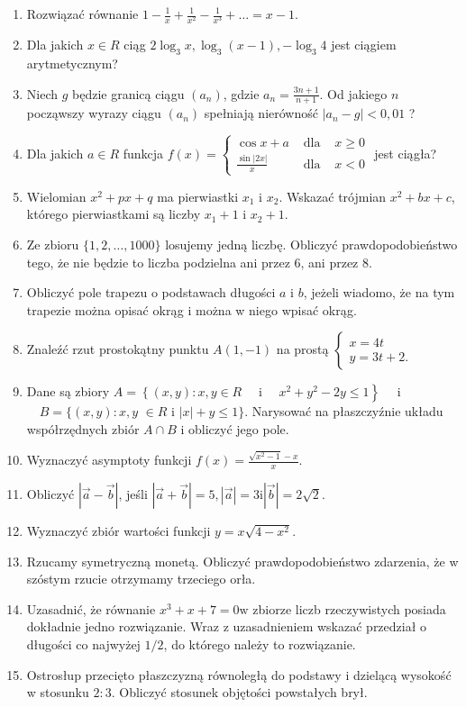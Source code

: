 \documentclass[10pt]{article}
\begin{document}
\begin{enumerate}
  \item Rozwiązać równanie \(1-\frac{1}{x}+\frac{1}{x^{2}}-\frac{1}{x^{3}}+\ldots=x-1\).
  \item Dla jakich \(x \in R\) ciąg \(2 \log _{3} x, \log _{3}(x-1),-\log _{3} 4\) jest ciągiem arytmetycznym?
  \item Niech \(g\) będzie granicą ciągu \(\left(a_{n}\right)\), gdzie \(a_{n}=\frac{3 n+1}{n+1}\). Od jakiego \(n\) począwszy wyrazy ciągu \(\left(a_{n}\right)\) spełniają nierówność \(\left|a_{n}-g\right|<0,01\) ?
  \item Dla jakich \(a \in R\) funkcja \(f(x)=\left\{\begin{array}{lll}\cos x+a & \text { dla } & x \geqslant 0 \\ \frac{\sin |2 x|}{x} & \text { dla } & x<0\end{array}\right.\) jest ciągła?
  \item Wielomian \(x^{2}+p x+q\) ma pierwiastki \(x_{1}\) i \(x_{2}\). Wskazać trójmian \(x^{2}+b x+c\), którego pierwiastkami są liczby \(x_{1}+1\) i \(x_{2}+1\).
  \item Ze zbioru \(\{1,2, \ldots, 1000\}\) losujemy jedną liczbę. Obliczyć prawdopodobieństwo tego, że nie będzie to liczba podzielna ani przez 6, ani przez 8.
  \item Obliczyć pole trapezu o podstawach długości \(a\) i \(b\), jeżeli wiadomo, że na tym trapezie można opisać okrąg i można w niego wpisać okrąg.
  \item Znaleźć rzut prostokątny punktu \(A(1,-1)\) na prostą \(\left\{\begin{array}{l}x=4 t \\ y=3 t+2 .\end{array}\right.\)
  \item Dane są zbiory \(A=\left\{(x, y): x, y \in R \quad\right.\) i \(\left.\quad x^{2}+y^{2}-2 y \leqslant 1\right\} \quad\) i \(\quad B=\{(x, y): x, y\) \(\in R\) i \(|x|+y \leqslant 1\}\). Narysować na płaszczyźnie układu współrzędnych zbiór \(A \cap B\) i obliczyć jego pole.
  \item Wyznaczyć asymptoty funkcji \(f(x)=\frac{\sqrt{x^{2}-1}-x}{x}\).
  \item Obliczyć \(|\vec{a}-\vec{b}|\), jeśli \(|\vec{a}+\vec{b}|=5,|\vec{a}|=3 \mathrm{i}|\vec{b}|=2 \sqrt{2}\).
  \item Wyznaczyć zbiór wartości funkcji \(y=x \sqrt{4-x^{2}}\).
  \item Rzucamy symetryczną monetą. Obliczyć prawdopodobieństwo zdarzenia, że w szóstym rzucie otrzymamy trzeciego orła.
  \item Uzasadnić, że równanie \(x^{3}+x+7=0 \mathrm{w}\) zbiorze liczb rzeczywistych posiada dokładnie jedno rozwiązanie. Wraz z uzasadnieniem wskazać przedział o długości co najwyżej \(1 / 2\), do którego należy to rozwiązanie.
  \item Ostrosłup przecięto płaszczyzną równoległą do podstawy i dzielącą wysokość w stosunku \(2: 3\). Obliczyć stosunek objętości powstałych brył.
\end{enumerate}
\end{document}
